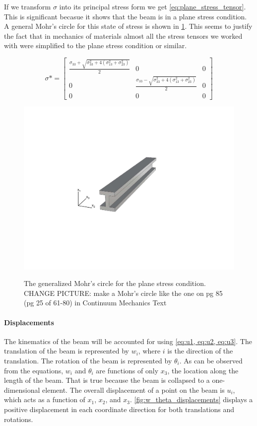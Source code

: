 If we transform $\sigma$ into its principal stress form we get \cref{eq:plane_stress_tensor}.
This is significant becasue it shows that the beam is in a plane stress condition. 
A general Mohr's circle for this state of stress is shown in \cref{fig:mohrs_circle}.
This seems to justify the fact that in mechanics of materials almost all the stress tensors we worked with were simplified to the plane stress condition or similar. 

\begin{equation}
\sigma* = \begin{bmatrix}
 \frac{\sigma_{33} + \sqrt{\sigma_{33}^2 + 4(\sigma_{13}^2 + \sigma_{23}^2)}}{2} & 0 & 0 \\
0 &  \frac{\sigma_{33} - \sqrt{\sigma_{33}^2 + 4(\sigma_{13}^2 + \sigma_{23}^2)}}{2} & 0 \\
0 & 0 & 0
\end{bmatrix}
\label{eq:plane_stress_tensor}
\end{equation}

\begin{figure}
\centering
\includegraphics[width=0.95\columnwidth,trim=4cm 7cm 6cm 6.5cm, clip]{figs/straight.pdf}
\label{fig:mohrs_circle}
\caption{The generalized Mohr's circle for the plane stress condition. CHANGE PICTURE: make a Mohr's circle like the one on pg 85 (pg 25 of 61-80) in Continuum Mechanics Text}
\end{figure}

\paragraph{Displacements}
The kinematics of the beam will be accounted for using \cref{eq:u1, eq:u2, eq:u3}.
The translation of the beam is represented by $w_i$, where $i$ is the direction of the translation.
The rotation of the beam is represented by $\theta_i$.
As can be observed from the equations, $w_i$ and $\theta_i$ are functions of only $x_3$, the location along the length of the beam.
That is true because the beam is collapsed to a one-dimensional element.
The overall displacement of a point on the beam is $u_i$, which acts as a function of $x_1$, $x_2$, and $x_3$.
\cref{fig:w_theta_displacements} displays a positive displacement in each coordinate direction for both translations and rotations. 


